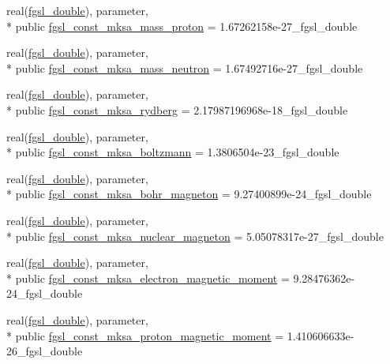 \begin{DoxyCompactItemize}
\item 
real(\hyperlink{classfgsl_a9af5113378e0f000eb479d3f90196ddf}{fgsl\-\_\-double}), parameter, \\*
public \hyperlink{classfgsl_a9b4432f549e95747550b45df3417757f}{fgsl\-\_\-const\-\_\-mksa\-\_\-mass\-\_\-proton} = 1.\-67262158e-\/27\-\_\-fgsl\-\_\-double
\item 
real(\hyperlink{classfgsl_a9af5113378e0f000eb479d3f90196ddf}{fgsl\-\_\-double}), parameter, \\*
public \hyperlink{classfgsl_a4480f5ff7a83600820b4cdaa8aff929e}{fgsl\-\_\-const\-\_\-mksa\-\_\-mass\-\_\-neutron} = 1.\-67492716e-\/27\-\_\-fgsl\-\_\-double
\item 
real(\hyperlink{classfgsl_a9af5113378e0f000eb479d3f90196ddf}{fgsl\-\_\-double}), parameter, \\*
public \hyperlink{classfgsl_a06f564b1101469e9756b3bb20be06b16}{fgsl\-\_\-const\-\_\-mksa\-\_\-rydberg} = 2.\-17987196968e-\/18\-\_\-fgsl\-\_\-double
\item 
real(\hyperlink{classfgsl_a9af5113378e0f000eb479d3f90196ddf}{fgsl\-\_\-double}), parameter, \\*
public \hyperlink{classfgsl_aee3fe8b4260b1d34436e9f66707b773e}{fgsl\-\_\-const\-\_\-mksa\-\_\-boltzmann} = 1.\-3806504e-\/23\-\_\-fgsl\-\_\-double
\item 
real(\hyperlink{classfgsl_a9af5113378e0f000eb479d3f90196ddf}{fgsl\-\_\-double}), parameter, \\*
public \hyperlink{classfgsl_afa92cd1a7ffe8a0106c3ae29720b0f84}{fgsl\-\_\-const\-\_\-mksa\-\_\-bohr\-\_\-magneton} = 9.\-27400899e-\/24\-\_\-fgsl\-\_\-double
\item 
real(\hyperlink{classfgsl_a9af5113378e0f000eb479d3f90196ddf}{fgsl\-\_\-double}), parameter, \\*
public \hyperlink{classfgsl_a01a0e11a78d0097f8c8a170dbea03e3f}{fgsl\-\_\-const\-\_\-mksa\-\_\-nuclear\-\_\-magneton} = 5.\-05078317e-\/27\-\_\-fgsl\-\_\-double
\item 
real(\hyperlink{classfgsl_a9af5113378e0f000eb479d3f90196ddf}{fgsl\-\_\-double}), parameter, \\*
public \hyperlink{classfgsl_ae360dd0b55b309065855f8521a316e0f}{fgsl\-\_\-const\-\_\-mksa\-\_\-electron\-\_\-magnetic\-\_\-moment} = 9.\-28476362e-\/24\-\_\-fgsl\-\_\-double
\item 
real(\hyperlink{classfgsl_a9af5113378e0f000eb479d3f90196ddf}{fgsl\-\_\-double}), parameter, \\*
public \hyperlink{classfgsl_a11b01d727e4e01028200e21ced0e16c2}{fgsl\-\_\-const\-\_\-mksa\-\_\-proton\-\_\-magnetic\-\_\-moment} = 1.\-410606633e-\/26\-\_\-fgsl\-\_\-double

\end{DoxyCompactItemize}
